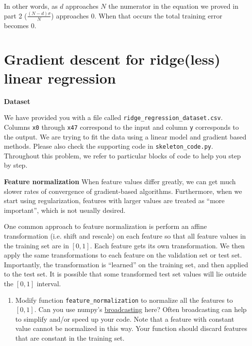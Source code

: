 \documentclass{article}
\newcommand{\nyuparagrah}[1]{\textcolor{nyupurple}{\large #1}}
\begin{document}
\begin{enumerate}
  In other words, as $d$ approaches $N$ the numerator in the equation we proved in part 2 ($\frac{(N-d)\sigma}{N}$) approaches $0$. When that occurs the total training error becomes 0.
   
\setcounter{saveenum}{\value{enumi}}
\end{enumerate}

\newpage

\section{\large Gradient descent for ridge(less) linear regression}

\nyuparagrah{\bf Dataset} 

We have provided you with a file called \texttt{ridge\_regression\_dataset.csv}. Columns \texttt{x0} through \texttt{x47} correspond to the input and column \texttt{y} corresponds to the output. We are trying to fit the data using a linear model and gradient based methods. Please also check the supporting code in \texttt{skeleton\_code.py}. Throughout this problem, we refer to particular blocks of code to help you step by step. 


\nyuparagrah{\bf Feature normalization}
When feature values differ greatly, we can get much slower rates of
convergence of gradient-based algorithms. Furthermore, when we start
using regularization, features with
larger values are treated as ``more important'', which is not usually
desired.  

One common approach to feature normalization is perform
an affine transformation (i.e. shift and rescale) on each feature
so that all feature values in the training set are in $[0,1]$. Each
feature gets its own transformation. We then apply the same transformations
to each feature on the validation set or test set. Importantly, the transformation is ``learned'' on the
training set, and then applied to the test set. It is possible that
some transformed test set values will lie outside the $[0,1]$ interval.

\begin{enumerate}
\setcounter{enumi}{\value{saveenum}}
    \item Modify function \texttt{feature\_normalization} to normalize all the
features to $[0,1]$. Can you use numpy's \href{https://docs.scipy.org/doc/numpy/user/basics.broadcasting.html}{broadcasting} here? Often broadcasting can help to simplify and/or speed up your code. Note that a feature with constant value cannot be normalized in
this way. Your function should discard features that are constant
in the training set.
\setcounter{saveenum}{\value{enumi}}
\end{enumerate}
\end{document}
